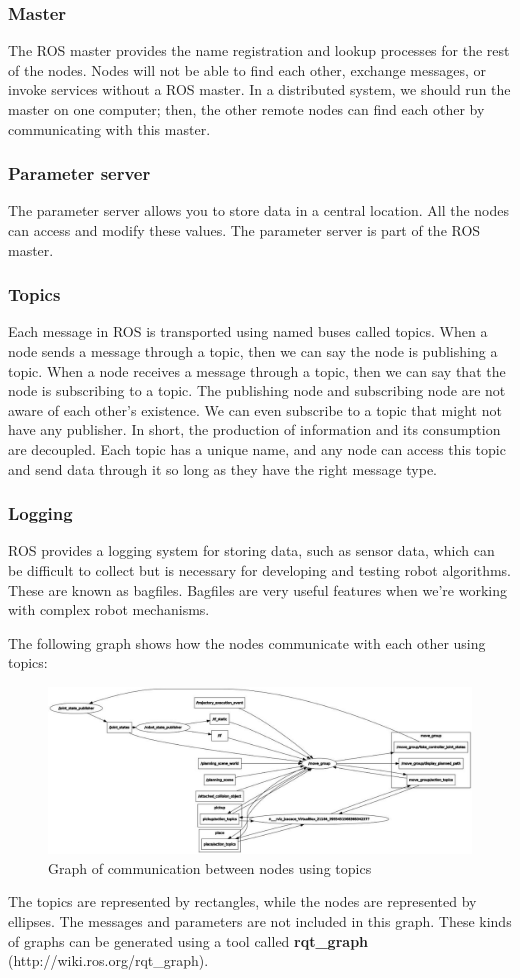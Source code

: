 \documentclass[../../main]{subfiles}
\begin{document}
\subsubsection{Master}
The ROS master provides the name registration and lookup processes for
the rest of the nodes. Nodes will not be able to find each other, exchange messages,
or invoke services without a ROS master. In a distributed system, we should run
the master on one computer; then, the other remote nodes can find each other by
communicating with this master.
\subsubsection{Parameter server}
The parameter server allows you to store data in a central
location. All the nodes can access and modify these values. The parameter server is
part of the ROS master.
\subsubsection{Topics}
Each message in ROS is transported using named buses called topics. When
a node sends a message through a topic, then we can say the node is publishing a
topic. When a node receives a message through a topic, then we can say that the
node is subscribing to a topic. The publishing node and subscribing node are not
aware of each other's existence. We can even subscribe to a topic that might not
have any publisher. In short, the production of information and its consumption are
decoupled. Each topic has a unique name, and any node can access this topic and
send data through it so long as they have the right message type.
\subsubsection{Logging}
ROS provides a logging system for storing data, such as sensor data,
which can be difficult to collect but is necessary for developing and testing robot
algorithms. These are known as bagfiles. Bagfiles are very useful features when we're
working with complex robot mechanisms.

The following graph shows how the nodes communicate with each other using topics:

\begin{figure}[ht]
    \centering
    \includegraphics{img/rqt_graph.jpg}
    \caption{Graph of communication between nodes using topics}
\end{figure}
The topics are represented by rectangles, while the nodes are represented by ellipses. The messages and parameters are not included in this graph. These kinds of graphs can be generated using a tool called \textbf{rqt\_graph} (http://wiki.ros.org/rqt\_graph).
\end{document}
